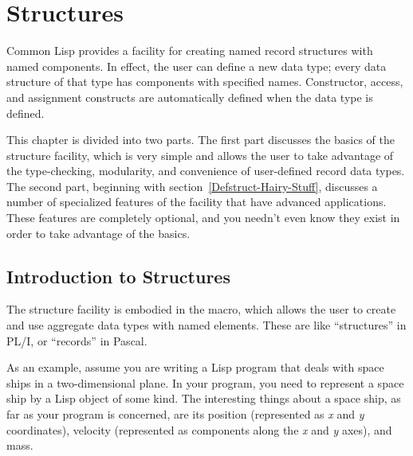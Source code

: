 
\clearpage\def\pagestatus{FINAL PROOF}

\ifx \rulang\Undef

\chapter{Structures}

Common Lisp provides a facility for creating named record structures
with named components.  In effect, the user can define a new data type;
every data structure of that type has components with specified names.
Constructor, access, and assignment constructs are automatically
defined when the data type is defined.

This chapter is divided into two parts.  The first part discusses
the basics of the structure facility, which is very simple and allows
the user to take advantage of the type-checking, modularity, and
convenience of user-defined record data types.  The second part,
beginning with section~\ref{Defstruct-Hairy-Stuff},
discusses a number of specialized features of the facility that
have advanced applications.  These features are completely optional,
and you needn't even know they exist in order to take
advantage of the basics.

\section{Introduction to Structures}
\label{DEFSTRUCT-INTRO-SECTION}

The structure facility is embodied in the  macro,
which allows the user to create and use
aggregate data types with named elements.  These are like
``structures'' in {PL/I}, or ``records'' in Pascal.

As an example, assume you are writing a Lisp
program that deals with space ships in a two-dimensional plane.
In your program, you need to
represent a space ship by a Lisp object of some kind.  The interesting
things about a space ship, as far as your program is concerned, are
its position (represented as \emph{x} and \emph{y} coordinates),
velocity (represented as components along the \emph{x} and \emph{y} axes), and
mass.

